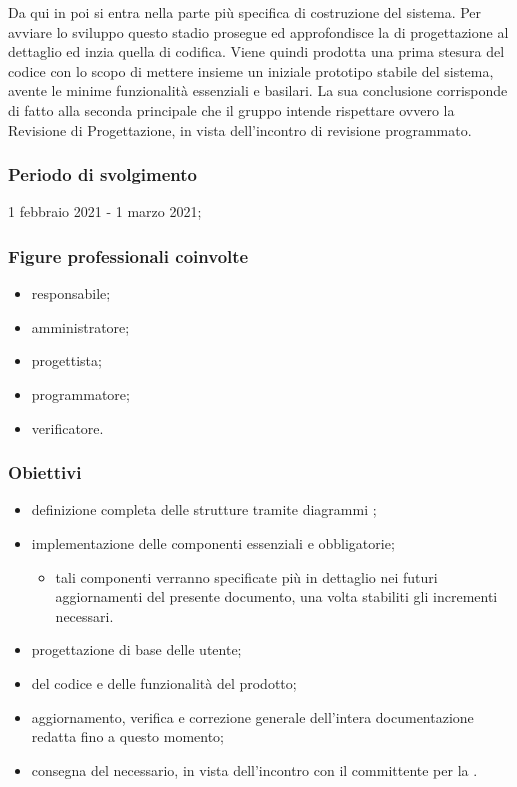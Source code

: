 Da qui in poi si entra nella parte più specifica di costruzione del sistema. Per avviare lo sviluppo questo stadio prosegue ed approfondisce la  di progettazione al dettaglio ed inzia quella di codifica. Viene quindi prodotta una prima stesura del codice con lo scopo di mettere insieme un iniziale prototipo stabile del sistema, avente le minime funzionalità essenziali e basilari. La sua conclusione corrisponde di fatto alla seconda  principale che il gruppo \Gruppo{} intende rispettare ovvero la Revisione di Progettazione, in vista dell'incontro di revisione programmato.
        
        \subsubsection{Periodo di svolgimento}
        1 febbraio 2021 - 1 marzo 2021;
        
        \subsubsection{Figure professionali coinvolte}
            \begin{itemize}
                \item responsabile;
                \item amministratore;
                \item progettista;
                \item programmatore;
                \item verificatore.
            \end{itemize}

        \subsubsection{Obiettivi}    
        \begin{itemize}
            \item definizione completa delle strutture tramite diagrammi ;
            \item implementazione delle componenti essenziali e obbligatorie;
            \begin{itemize}
                \item tali componenti verranno specificate più in dettaglio nei futuri aggiornamenti del presente documento, una volta stabiliti gli incrementi necessari.
            \end{itemize}
            \item progettazione di base delle  utente;
            \item {} del codice e delle funzionalità del prodotto;
            \item aggiornamento, verifica e correzione generale dell'intera documentazione redatta fino a questo momento;
            \item consegna del  necessario, in vista dell'incontro con il committente per la \RP{}.
        \end{itemize}